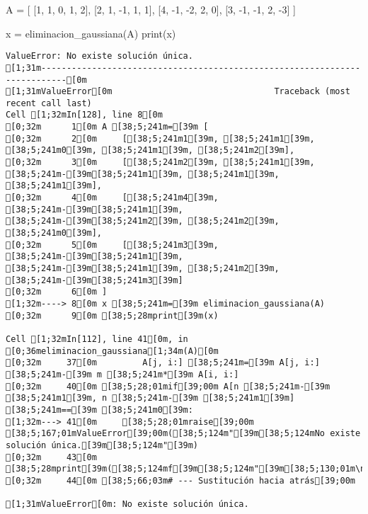 \documentclass[
  letterpaper,
  DIV=11,
  numbers=noendperiod]{scrartcl}
\newenvironment{Shaded}{\begin{snugshade}}{\end{snugshade}}
\newcommand{\BuiltInTok}[1]{\textcolor[rgb]{0.00,0.23,0.31}{#1}}
\newcommand{\DecValTok}[1]{\textcolor[rgb]{0.68,0.00,0.00}{#1}}
\newcommand{\NormalTok}[1]{\textcolor[rgb]{0.00,0.23,0.31}{#1}}
\newcommand{\OperatorTok}[1]{\textcolor[rgb]{0.37,0.37,0.37}{#1}}
\begin{document}
\begin{Shaded}
\begin{Highlighting}[]

\NormalTok{A }\OperatorTok{=}\NormalTok{ [}
\NormalTok{    [}\DecValTok{1}\NormalTok{, }\DecValTok{1}\NormalTok{, }\DecValTok{0}\NormalTok{, }\DecValTok{1}\NormalTok{, }\DecValTok{2}\NormalTok{],}
\NormalTok{    [}\DecValTok{2}\NormalTok{, }\DecValTok{1}\NormalTok{, }\OperatorTok{{-}}\DecValTok{1}\NormalTok{, }\DecValTok{1}\NormalTok{, }\DecValTok{1}\NormalTok{],}
\NormalTok{    [}\DecValTok{4}\NormalTok{, }\OperatorTok{{-}}\DecValTok{1}\NormalTok{, }\OperatorTok{{-}}\DecValTok{2}\NormalTok{, }\DecValTok{2}\NormalTok{, }\DecValTok{0}\NormalTok{],}
\NormalTok{    [}\DecValTok{3}\NormalTok{, }\OperatorTok{{-}}\DecValTok{1}\NormalTok{, }\OperatorTok{{-}}\DecValTok{1}\NormalTok{, }\DecValTok{2}\NormalTok{, }\OperatorTok{{-}}\DecValTok{3}\NormalTok{]}
\NormalTok{]}

\NormalTok{x }\OperatorTok{=}\NormalTok{ eliminacion\_gaussiana(A)}
\BuiltInTok{print}\NormalTok{(x)}
\end{Highlighting}
\end{Shaded}

\begin{verbatim}
ValueError: No existe solución única.
[1;31m---------------------------------------------------------------------------[0m
[1;31mValueError[0m                                Traceback (most recent call last)
Cell [1;32mIn[128], line 8[0m
[0;32m      1[0m A [38;5;241m=[39m [
[0;32m      2[0m     [[38;5;241m1[39m, [38;5;241m1[39m, [38;5;241m0[39m, [38;5;241m1[39m, [38;5;241m2[39m],
[0;32m      3[0m     [[38;5;241m2[39m, [38;5;241m1[39m, [38;5;241m-[39m[38;5;241m1[39m, [38;5;241m1[39m, [38;5;241m1[39m],
[0;32m      4[0m     [[38;5;241m4[39m, [38;5;241m-[39m[38;5;241m1[39m, [38;5;241m-[39m[38;5;241m2[39m, [38;5;241m2[39m, [38;5;241m0[39m],
[0;32m      5[0m     [[38;5;241m3[39m, [38;5;241m-[39m[38;5;241m1[39m, [38;5;241m-[39m[38;5;241m1[39m, [38;5;241m2[39m, [38;5;241m-[39m[38;5;241m3[39m]
[0;32m      6[0m ]
[1;32m----> 8[0m x [38;5;241m=[39m eliminacion_gaussiana(A)
[0;32m      9[0m [38;5;28mprint[39m(x)

Cell [1;32mIn[112], line 41[0m, in [0;36meliminacion_gaussiana[1;34m(A)[0m
[0;32m     37[0m         A[j, i:] [38;5;241m=[39m A[j, i:] [38;5;241m-[39m m [38;5;241m*[39m A[i, i:]
[0;32m     40[0m [38;5;28;01mif[39;00m A[n [38;5;241m-[39m [38;5;241m1[39m, n [38;5;241m-[39m [38;5;241m1[39m] [38;5;241m==[39m [38;5;241m0[39m:
[1;32m---> 41[0m     [38;5;28;01mraise[39;00m [38;5;167;01mValueError[39;00m([38;5;124m"[39m[38;5;124mNo existe solución única.[39m[38;5;124m"[39m)
[0;32m     43[0m     [38;5;28mprint[39m([38;5;124mf[39m[38;5;124m"[39m[38;5;130;01m\n[39;00m[38;5;132;01m{[39;00mA[38;5;132;01m}[39;00m[38;5;124m"[39m)
[0;32m     44[0m [38;5;66;03m# --- Sustitución hacia atrás[39;00m

[1;31mValueError[0m: No existe solución única.
\end{verbatim}
\end{document}
